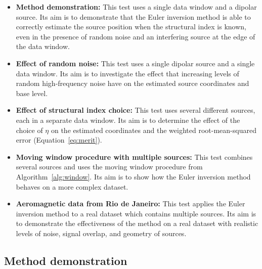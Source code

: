 \begin{itemize}
    \item \textbf{Method demonstration:} This test uses a single data window 
        and a dipolar source. Its aim is to demonstrate that the Euler 
        inversion method is able to correctly estimate the source position
        when the structural index is known, even in the presence of random
        noise and an interfering source at the edge of the data window. 
    \item \textbf{Effect of random noise:} This test uses a single dipolar 
        source and a single data window. Its aim is to investigate the
        effect that increasing levels of random high-frequency noise have 
        on the estimated source coordinates and base level.
    \item \textbf{Effect of structural index choice:} This test uses several
        different sources, each in a separate data window. Its aim is to
        determine the effect of the choice of $\eta$ on the estimated 
        coordinates and the weighted root-mean-squared error 
        (Equation~\ref{eq:merit}).
    \item \textbf{Moving window procedure with multiple sources:} This test
        combines several sources and uses the moving window procedure from
        Algorithm~\ref{alg:window}. Its aim is to show how the Euler inversion
        method behaves on a more complex dataset.
    \item \textbf{Aeromagnetic data from Rio de Janeiro:} This test applies
        the Euler inversion method to a real dataset which contains multiple
        sources. Its aim is to demonstrate the effectiveness of the method 
        on a real dataset with realistic levels of noise, signal overlap,
        and geometry of sources.
\end{itemize}

\subsection{Method demonstration}

